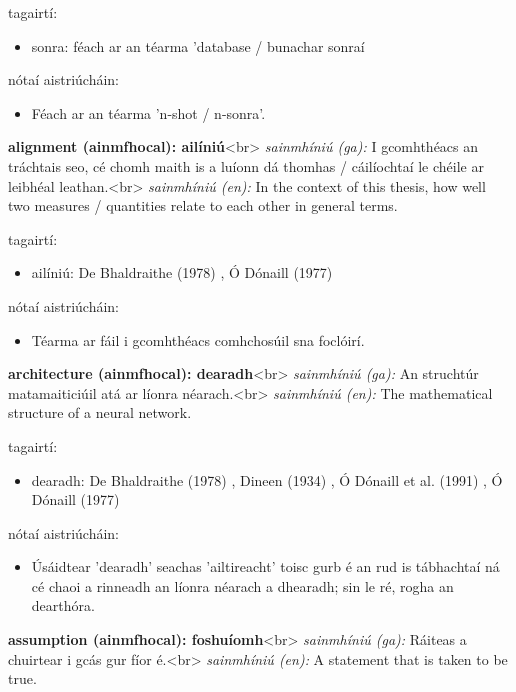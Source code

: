 \documentclass{article}
\begin{document}
tagairtí:
\begin{itemize}
	\item sonra: féach ar an téarma 'database / bunachar sonraí
\end{itemize}

nótaí aistriúcháin:
\begin{itemize}
	\item Féach ar an téarma 'n-shot / n-sonra'.
\end{itemize}


\textbf{alignment (ainmfhocal): ailíniú}<br>
\textit{sainmhíniú (ga):} I gcomhthéacs an tráchtais seo, cé chomh maith is a luíonn dá thomhas / cáilíochtaí le chéile ar leibhéal leathan.<br>
\textit{sainmhíniú (en):} In the context of this thesis, how well two measures / quantities relate to each other in general terms.

tagairtí:
\begin{itemize}
	\item ailíniú: De Bhaldraithe (1978) \cite{de-bhaldraithe}, Ó Dónaill (1977) \cite{odonaill}
\end{itemize}

nótaí aistriúcháin:
\begin{itemize}
	\item Téarma ar fáil i gcomhthéacs comhchosúil sna foclóirí.
\end{itemize}


\textbf{architecture (ainmfhocal): dearadh}<br>
\textit{sainmhíniú (ga):} An struchtúr matamaiticiúil atá ar líonra néarach.<br>
\textit{sainmhíniú (en):} The mathematical structure of a neural network.

tagairtí:
\begin{itemize}
	\item dearadh: De Bhaldraithe (1978) \cite{de-bhaldraithe}, Dineen (1934) \cite{dineen}, Ó Dónaill et al. (1991) \cite{focloir-beag}, Ó Dónaill (1977) \cite{odonaill}
\end{itemize}

nótaí aistriúcháin:
\begin{itemize}
	\item Úsáidtear 'dearadh' seachas 'ailtireacht' toisc gurb é an rud is tábhachtaí ná cé chaoi a rinneadh an líonra néarach a dhearadh; sin le ré, rogha an dearthóra.
\end{itemize}


\textbf{assumption (ainmfhocal): foshuíomh}<br>
\textit{sainmhíniú (ga):} Ráiteas a chuirtear i gcás gur fíor é.<br>
\textit{sainmhíniú (en):} A statement that is taken to be true.
\end{document}
